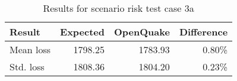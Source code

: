 \begin{table}[htbp]

\centering
\begin{tabular}{ l r r r }

\hline
\rowcolor{anti-flashwhite}
\bf{Result} & \bf{Expected} & \bf{OpenQuake} & \bf{Difference}\\
\hline
Mean loss & 1798.25 & 1783.93 & 0.80\% \\
Std. loss & 1808.36 & 1804.20 & 0.23\% \\
\hline
\end{tabular}

\caption{Results for scenario risk test case 3a}
\label{tab:result-scenario-risk-3a}
\end{table}